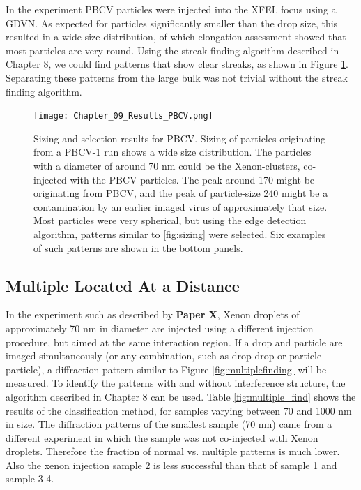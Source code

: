 In the experiment PBCV particles were injected into the XFEL focus using a GDVN. As expected for particles significantly smaller than the drop size, this resulted in a wide size distribution, of which elongation assessment showed that most particles are very round. Using the streak finding algorithm described in Chapter 8, we could find patterns that show clear streaks, as shown in Figure \ref{fig:PatternSelection}. Separating these patterns from the large bulk was not trivial without the streak finding algorithm.

\begin{figure}[!h]
\centering
\texttt{[image: Chapter\_09\_Results\_PBCV.png]}
\caption{Sizing and selection results for PBCV. Sizing of particles originating from a PBCV-1 run shows a wide size distribution. The particles with a diameter of around 70 nm could be the Xenon-clusters, co-injected with the PBCV particles. The peak around 170 might be originating from PBCV, and the peak of particle-size 240 might be a contamination by an earlier imaged virus of approximately that size. Most particles were very spherical, but using the edge detection algorithm, patterns similar to \ref{fig:sizing} were selected. Six examples of such patterns are shown in the bottom panels.}\label{fig:PatternSelection}

\end{figure}


\subsection{Multiple Located At a Distance}

In the experiment such as described by \textbf{Paper X}, Xenon droplets of approximately 70 nm in diameter are injected using a different injection procedure, but aimed at the same interaction region. If a drop and particle are imaged simultaneously (or any combination, such as drop-drop or particle-particle), a diffraction pattern similar to Figure \ref{fig:multiplefinding} will be measured. To identify the patterns with and without interference structure, the algorithm described in Chapter 8 can be used. Table \ref{fig:multiple_find} shows the results of the classification method, for samples varying between 70 and 1000 nm in size. The diffraction patterns of the smallest sample (70 nm) came from a different experiment in which the sample was not co-injected with Xenon droplets. Therefore the fraction of normal vs. multiple patterns is much lower. Also the xenon injection sample 2 is less successful than that of sample 1 and sample 3-4.

